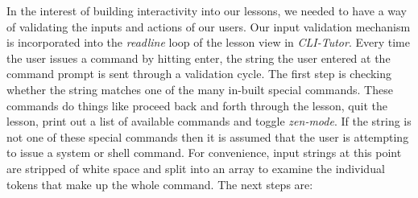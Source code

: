 In the interest of building interactivity into our lessons, we needed to have a way of
validating the inputs and actions of our users. Our input validation mechanism
is incorporated into the \textit{readline} loop of the lesson view in
\textit{CLI-Tutor}. Every time the user issues a command by hitting enter, the
string the user entered at the command prompt is sent through a validation
cycle. The first step is checking whether the string matches one of the many
in-built special commands. These commands do things like proceed back and forth
through the lesson, quit the lesson, print out a list of available commands and
toggle \textit{zen-mode}. If the string is not one of these special commands
then it is assumed that the user is attempting to issue a system or shell
command. For convenience, input strings at this point are stripped of white space and split into an array
to examine the individual tokens that make up the whole command. The next steps are:

